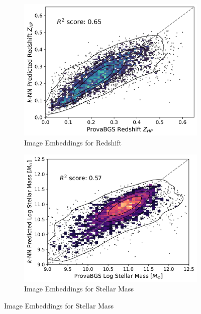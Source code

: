 \documentclass[a4paper,12pt]{article}
\begin{document}
\begin{figure}[H]
    \centering
    \begin{subfigure}[b]{0.48\textwidth}
        \centering
        \includegraphics[width=\textwidth]{../figures/zeroshot_redshift_image.png}
        \caption{Image Embeddings for Redshift}
        \label{fig:redshift_image}
    \end{subfigure}%
    \hfill
    \begin{subfigure}[b]{0.48\textwidth}
        \centering
        \includegraphics[width=\textwidth]{../figures/zeroshot_stellarmass_image.png}
        \caption{Image Embeddings for Stellar Mass}
        \label{fig:stellarmass_image}
    \end{subfigure}
    

\end{figure}
\end{document}
